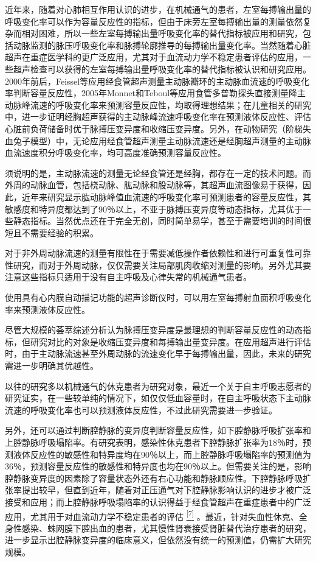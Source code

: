 近年来，随着对心肺相互作用认识的进步，在机械通气的患者，左室每搏输出量的呼吸变化率可以作为容量反应性的指标，但由于床旁左室每搏输出量的测量依然复杂而相对困难，所以一些左室每搏输出量呼吸变化率的替代指标被应用和研究，包括动脉监测的脉压呼吸变化率和脉搏轮廓推导的每搏输出量变化率。当然随着心脏超声在重症医学科的更广泛应用，尤其对于血流动力学不稳定患者评估的应用，一些超声检查可以获得的左室每搏输出量呼吸变化率的替代指标被认识和研究应用。2000年前后，Feissel等应用经食管超声测量主动脉瓣环的主动脉血流速的呼吸变化率判断容量反应性，2005年Monnet和Teboul等应用食管多普勒探头直接测量降主动脉峰流速的呼吸变化率来预测容量反应性，均取得理想结果；在儿童相关的研究中，进一步证明经胸超声获得的主动脉峰流速呼吸变化率在预测液体反应性、评估心脏前负荷储备时优于脉搏压变异度和收缩压变异度。另外，在动物研究（阶梯失血兔子模型）中，无论应用经食管超声测量主动脉流速还是经胸超声测量的主动脉血流速度积分呼吸变化率，均可高度准确预测容量反应性。

须说明的是，主动脉流速的测量无论经食管还是经胸，都存在一定的技术问题。而外周的动脉血管，包括桡动脉、肱动脉和股动脉等，其超声血流图像易于获得，因此，近年来研究显示肱动脉峰值血流速的呼吸变化率可预测患者的容量反应性，其敏感度和特异度都达到了90％以上，不亚于脉搏压变异度等动态指标，尤其优于一些静态指标。当然优点还在于完全无创，同时简单易学，甚至于需要培训的时间很短且不需要经验的积累。

对于非外周动脉流速的测量有限性在于需要减低操作者依赖性和进行可重复性可靠性研究，而对于外周动脉，仅仅需要关注局部肌肉收缩对测量的影响。另外尤其要注意这些指标只适用于没有自主呼吸及心律失常的机械通气患者。

使用具有心内膜自动描记功能的超声诊断仪时，可以用左室每搏射血面积呼吸变化率来预测液体反应性。

尽管大规模的荟萃综述分析认为脉搏压变异度是最理想的判断容量反应性的动态指标，但研究对比的对象是收缩压变异度和每搏输出量变异度。在应用超声进行评估时，由于主动脉流速甚至外周动脉的流速变化早于每搏输出量，因此，未来的研究需进一步明确其优越性。

以往的研究多以机械通气的休克患者为研究对象，最近一个关于自主呼吸志愿者的研究证实，在一些较单纯的情况下，如仅仅低血容量时，在自主呼吸状态下主动脉流速的呼吸变化率也可以预测液体反应性，不过此研究需要进一步验证。

另外，还可以通过判断腔静脉的变异度判断容量反应性，如下腔静脉呼吸扩张率和上腔静脉呼吸塌陷率。有研究表明，感染性休克患者下腔静脉扩张率为18％时，预测液体反应性的敏感性和特异度均在90％以上，而上腔静脉呼吸塌陷率的预测值为36％，预测容量反应性的敏感性和特异度也均在90％以上。但需要关注的是，影响腔静脉变异度的因素除了容量状态外还有右心功能和静脉顺应性。下腔静脉呼吸扩张率提出较早，但直到近年，随着对正压通气对下腔静脉影响认识的进步才被广泛接受和应用；而上腔静脉呼吸塌陷率的认识得益于经食管超声在重症患者中的广泛应用，尤其用于对血流动力学不稳定患者的评估
\protect\hyperlink{text00009.htmlux5cux23ch7-8}{\textsuperscript{{[}7{]}}}
。最近，针对失血性休克、全身性感染、蛛网膜下腔出血的患者，尤其慢性肾衰接受肾脏替代治疗患者的研究，进一步显示出腔静脉变异度的临床意义，但依然没有统一的预测值，仍需扩大研究规模。


